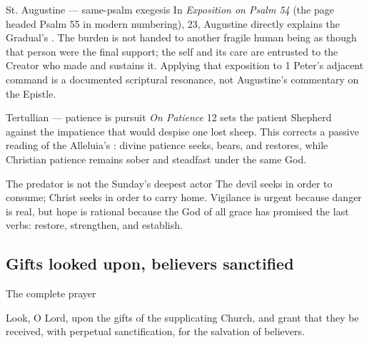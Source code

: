 \begin{deepstudy}
\begin{sourcecard}{St. Augustine --- same-psalm exegesis}
In \emph{Exposition on Psalm 54} (the page headed Psalm 55 in modern numbering), 23, Augustine directly explains the Gradual's . The burden is not handed to another fragile human being as though that person were the final support; the self and its care are entrusted to the Creator who made and sustains it. Applying that exposition to 1 Peter's adjacent command is a documented scriptural resonance, not Augustine's commentary on the Epistle.
\end{sourcecard}

\begin{sourcecard}{Tertullian --- patience is pursuit}
\emph{On Patience} 12 sets the patient Shepherd against the impatience that would despise one lost sheep. This corrects a passive reading of the Alleluia's : divine patience seeks, bears, and restores, while Christian patience remains sober and steadfast under the same God.
\end{sourcecard}

\begin{massbox}{The predator is not the Sunday's deepest actor}
The devil seeks in order to consume; Christ seeks in order to carry home. Vigilance is urgent because danger is real, but hope is rational because the God of all grace has promised the last verbs: restore, strengthen, and establish.
\end{massbox}

\sectionguard
\subsection*{Gifts looked upon, believers sanctified\enspace{}}

\begin{studybox}{The complete prayer}

Look, O Lord, upon the gifts of the supplicating Church, and grant that they be received, with perpetual sanctification, for the salvation of believers.
\end{studybox}


\end{deepstudy}
